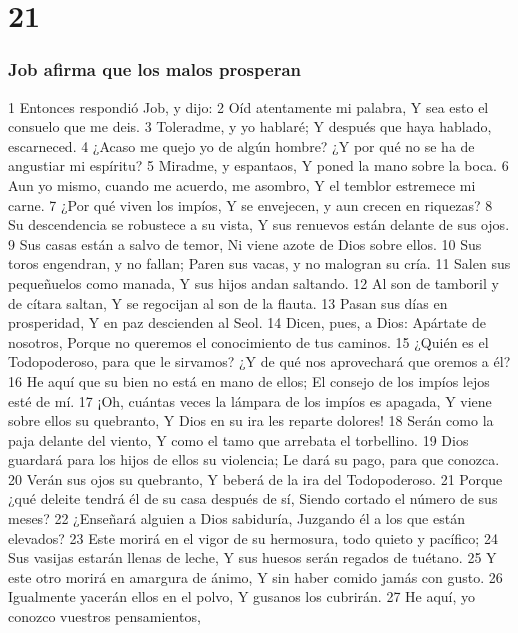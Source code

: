 \chapter{21}

\subsection*{Job afirma que los malos prosperan}  

1 Entonces respondió Job, y dijo:  
2 Oíd atentamente mi palabra,  
Y sea esto el consuelo que me deis.  
3 Toleradme, y yo hablaré;  
Y después que haya hablado, escarneced.  
4 ¿Acaso me quejo yo de algún hombre?  
¿Y por qué no se ha de angustiar mi espíritu?  
5 Miradme, y espantaos,  
Y poned la mano sobre la boca.  
6 Aun yo mismo, cuando me acuerdo, me asombro,  
Y el temblor estremece mi carne.  
7 ¿Por qué viven los impíos,  
Y se envejecen, y aun crecen en riquezas?  
8 Su descendencia se robustece a su vista,  
Y sus renuevos están delante de sus ojos.  
9 Sus casas están a salvo de temor,  
Ni viene azote de Dios sobre ellos.  
10 Sus toros engendran, y no fallan;  
Paren sus vacas, y no malogran su cría.  
11 Salen sus pequeñuelos como manada,  
Y sus hijos andan saltando.  
12 Al son de tamboril y de cítara saltan,  
Y se regocijan al son de la flauta.  
13 Pasan sus días en prosperidad,  
Y en paz descienden al Seol.  
14 Dicen, pues, a Dios: Apártate de nosotros,  
Porque no queremos el conocimiento de tus caminos.  
15 ¿Quién es el Todopoderoso, para que le sirvamos?  
¿Y de qué nos aprovechará que oremos a él?  
16 He aquí que su bien no está en mano de ellos;  
El consejo de los impíos lejos esté de mí.  
17 ¡Oh, cuántas veces la lámpara de los impíos es apagada,  
Y viene sobre ellos su quebranto,  
Y Dios en su ira les reparte dolores!  
18 Serán como la paja delante del viento,  
Y como el tamo que arrebata el torbellino.  
19 Dios guardará para los hijos de ellos su violencia;  
Le dará su pago, para que conozca.  
20 Verán sus ojos su quebranto,  
Y beberá de la ira del Todopoderoso.  
21 Porque ¿qué deleite tendrá él de su casa después de sí,  
Siendo cortado el número de sus meses?  
22 ¿Enseñará alguien a Dios sabiduría,  
Juzgando él a los que están elevados?  
23 Este morirá en el vigor de su hermosura, todo quieto y pacífico;  
24 Sus vasijas estarán llenas de leche,  
Y sus huesos serán regados de tuétano.  
25 Y este otro morirá en amargura de ánimo,  
Y sin haber comido jamás con gusto.  
26 Igualmente yacerán ellos en el polvo,  
Y gusanos los cubrirán.  
27 He aquí, yo conozco vuestros pensamientos,  
